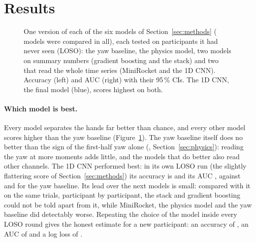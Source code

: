 \section{Results}\label{sec:results}

\begin{figure}[tbp]
\centering
{}
\caption{One version of each of the six models of Section~\ref{sec:methods} ( models were
compared in all), each tested on participants it had never seen (LOSO): the yaw baseline, the physics model, two
models on summary numbers (gradient boosting and the stack) and two that read the whole time series (MiniRocket and
the 1D CNN). Accuracy (left) and AUC (right) with their 95\,\% CIs. The 1D CNN, the final model (blue), scores
highest on both.}
\label{fig:families}
\end{figure}

\paragraph{Which model is best.} Every model separates the hands far better than chance, and every other model scores
higher than the yaw baseline (Figure~\ref{fig:families}). The yaw baseline itself does no better than the sign of the
first-half yaw alone (, Section~\ref{sec:physics}): reading the yaw at more
moments adds little, and the models that do better also read other channels. The 1D CNN performed best: in its own
LOSO run (the slightly flattering score of Section~\ref{sec:methods}) its accuracy is 
and its AUC , against  and  for the yaw baseline.
Its lead over the next models is small: compared with it on the same trials, participant by participant, the stack
and gradient boosting could not be told apart from it, while MiniRocket, the physics model and the yaw baseline did
detectably worse. Repeating the choice of the model inside every LOSO round gives the honest estimate for a new
participant: an accuracy of , an AUC of  and a log loss of
.

